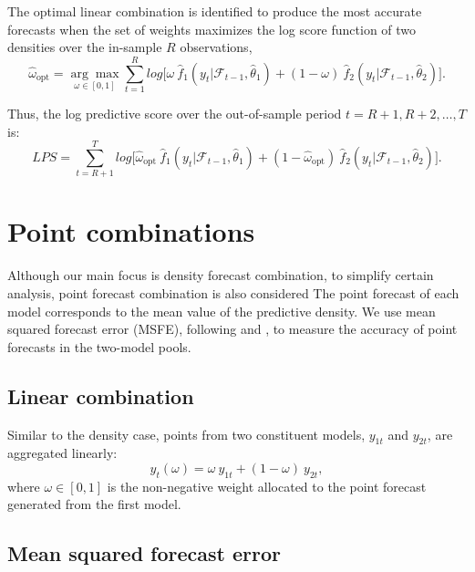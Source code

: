 \documentclass{monashthesis}
\begin{document}
The optimal linear combination is identified to produce the most accurate forecasts when the set of weights maximizes the log score function of two densities over the in-sample \(R\) observations,
\begin{equation}
\label{eqn:LS2}
\hat{\omega}_{\text{opt}} =  \underset{\omega \in [0,1]}{\arg\max} \sum^R_{t=1} log \Big[ \omega \ \hat f_1(y_t| \mathcal{F}_{t-1}, \hat\theta_{1}) + (1-\omega) \ \hat f_2(y_t| \mathcal{F}_{t-1}, \hat\theta_{2})\Big].
\end{equation}

Thus, the log predictive score over the out-of-sample period \(t = R+1, R+2, \dots, T\) is:
\begin{equation}
\label{eqn:LS3}
LPS = \sum^T_{t = R+1} log \Big[ \hat{\omega}_{\text{opt}} \ \hat f_1(y_t| \mathcal{F}_{t-1}, \hat\theta_{1}) + (1- \hat{\omega}_{\text{opt}}) \ \hat f_2(y_t| \mathcal{F}_{t-1}, \hat\theta_{2})\Big].
\end{equation}

\hypertarget{point-combinations}{%
\section{Point combinations}\label{point-combinations}}

Although our main focus is density forecast combination, to simplify certain analysis, point forecast combination is also considered The point forecast of each model corresponds to the mean value of the predictive density. We use mean squared forecast error (MSFE), following \textcite{BG69} and \textcite{SW09}, to measure the accuracy of point forecasts in the two-model pools.

\subsection*{Linear combination}

Similar to the density case, points from two constituent models, \(y_{1t}\) and \(y_{2t}\), are aggregated linearly:
\begin{equation*}
y_t({\omega}) = \omega \ y_{1t} + (1-\omega) \ y_{2t},
\end{equation*}
where \(\omega\in [0,1]\) is the non-negative weight allocated to the point forecast generated from the first model.

\vspace{5mm}

\subsection*{Mean squared forecast error}
\end{document}

